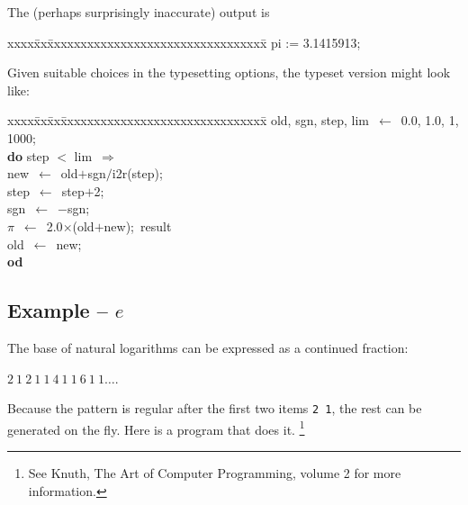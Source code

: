 \noindent
The (perhaps surprisingly inaccurate) output is \begin{tt} 
\begin{tabbing}
xxxx\=xx\=xxxxxxxxxxxxxxxxxxxxxxxxxxxxxxxxx\=\kill
\>pi := 3.1415913;
\end{tabbing}
\end{tt}

\noindent Given suitable choices in the typesetting options, the typeset 
version might look like:

\begin{tabbing}
xxxx\=xx\=xx\=xxxxxxxxxxxxxxxxxxxxxxxxxxxxxxx\=\kill
\>  old, sgn, step, lim\ $\leftarrow$\ 0.0, 1.0, 1, 1000;              \\
\>  {\bf do}  step $<$ lim\ $\Rightarrow$                              \\
\>\>      new\ $\leftarrow$\ old$+$sgn$/$i2r(step);                    \\
\>\>      step\ $\leftarrow$\ step$+$2;                                \\
\>\>      sgn\ $\leftarrow$\ $-$sgn;                                   \\
\>\>      $\pi$\ $\leftarrow$\ 2.0$\times$(old$+$new);\>\>\bq\ result  \\
\>\>      old\ $\leftarrow$\ new;                                      \\
\>  {\bf od}
\end{tabbing}

\subsection{Example -- $e$}

\noindent
The base of natural logarithms can be expressed as a continued fraction:

\mbox{$2\ 1\ 2\ 1\ 1\ 4\ 1\ 1\ 6\ 1\ 1\dots$}.  

\noindent
Because the pattern is regular after the first two items {\tt 2\ 1}, 
the rest can be generated on the fly.  
Here is a program that does it.
\footnote{See Knuth, The Art of Computer Programming, volume 2 for more 
information.}

